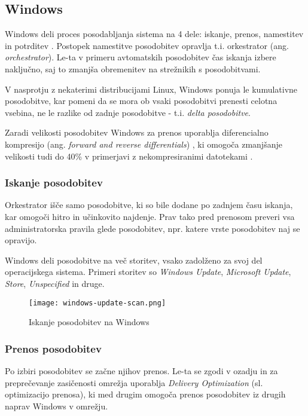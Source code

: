 \subsection{Windows}

Windows deli proces posodabljanja sistema na 4 dele: iskanje, prenos, namestitev in potrditev \cite{windows-update}.
Postopek namestitve posodobitev opravlja t.i. orkestrator (ang. \emph{orchestrator}).
Le-ta v primeru avtomatskih posodobitev čas iskanja izbere naključno, saj to zmanjša obremenitev na strežnikih s
posodobitvami.

V nasprotju z nekaterimi distribucijami Linux, Windows ponuja le kumulativne posodobitve, kar pomeni da se mora ob vsaki
posodobitvi prenesti celotna vsebina, ne le razlike od zadnje posodobitve - t.i. \emph{delta posodobitve}.

Zaradi velikosti posodobitev Windows za prenos uporablja diferencialno kompresijo
(ang. \emph{forward and reverse differentials}) \cite{windows-update-compression}, ki omogoča zmanjšanje velikosti
tudi do 40\% v primerjavi z nekompresiranimi datotekami \cite{windows-update-compression-2}.

\subsubsection{Iskanje posodobitev}

Orkestrator išče samo posodobitve, ki so bile dodane po zadnjem času iskanja, kar omogoči hitro in učinkovito najdenje.
Prav tako pred prenosom preveri vsa administratorska pravila glede posodobitev, npr. katere vrste posodobitev
naj se opravijo.

Windows deli posodobitve na več storitev, vsako zadolženo za svoj del operacijskega sistema.
Primeri storitev so \emph{Windows Update}, \emph{Microsoft Update}, \emph{Store}, \emph{Unspecified} in druge.

\begin{figure}[H]
    \centering
    \texttt{[image: windows-update-scan.png]}
    \caption{Iskanje posodobitev na Windows \cite{windows-update}}
\end{figure}

\subsubsection{Prenos posodobitev}

Po izbiri posodobitev se začne njihov prenos. Le-ta se zgodi v ozadju in za preprečevanje zasičenosti omrežja
uporablja \emph{Delivery Optimization} (sl. optimizacijo prenosa), ki med drugim omogoča prenos posodobitev iz
drugih naprav Windows v omrežju.


